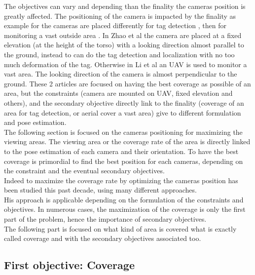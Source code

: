 The objectives can vary and depending than the finality the cameras position is greatly affected.
The positioning of the camera is impacted by the finality as example for the cameras are placed differently for tag detection \cite{22*zhao2008}, then  for monitoring a vast outside area \cite{146*li2011}.  In Zhao et al \cite{22*zhao2008} the camera are placed at a fixed elevation (at the height of the torso) with a looking  direction almost parallel to the ground, instead to can do the tag detection and localization with no too much deformation of the tag. Otherwise in Li et al \cite{146*li2011} an UAV is used to monitor a vast area. The looking direction of the camera is almost perpendicular to the ground. These 2 articles are focused on having the best coverage as possible of an area, but the constraints (camera are mounted on UAV, fixed elevation and others), and the secondary objective directly link to the finality (coverage of an area for tag detection, or aerial cover a vast area) give to different formulation and pose estimation.
\\
The following section is focused on the cameras positioning for maximizing the viewing areas. The viewing area or the coverage rate of the area is directly linked to the pose estimation of each camera and their orientation. To have the best coverage is primordial to find the best position for each cameras, depending on the constraint and the eventual secondary objectives.\\
Indeed to maximize the coverage rate by optimizing the cameras position has been studied this past decade, using many different approaches. \\
His approach is applicable depending on the formulation of the constraints and objectives. In numerous cases, the maximization of the coverage is only the first part of the problem, hence the importance of secondary objectives.\\
The following part is focused on what kind of area is covered what is exactly called coverage and with the secondary objectives associated too.

\subsection{First objective: Coverage }\label{sec:FirstObjCover}

